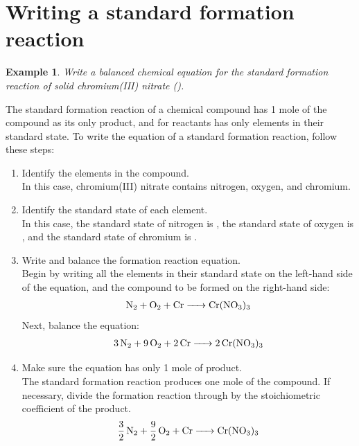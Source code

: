 \documentclass{article}  %
\newtheorem{exmp}{Example}
\begin{document}
\section*{Writing a standard formation reaction}
\begin{exmp}
    Write a balanced chemical equation for the standard formation reaction of solid chromium(III) nitrate (). 
\end{exmp}
The standard formation reaction of a chemical compound has 1 mole of the compound as its only product, and for reactants has only elements in their standard state.
To write the equation of a standard formation reaction, follow these steps:
\begin{enumerate}
    \item Identify the elements in the compound. \\
        In this case, chromium(III) nitrate contains nitrogen, oxygen, and chromium. 
    \item Identify the standard state of each element. \\
        In this case, the standard state of nitrogen is , the standard state of oxygen is , and the standard state of chromium is . 
    \item Write and balance the formation reaction equation.\\
        Begin by writing all the elements in their standard state on the left-hand side of the equation, and the compound to be formed on the right-hand side: 
            \begin{equation*}
                \begin{aligned}
                    \ce{N2 + O2 + Cr -> Cr(NO3)3}
                \end{aligned}
            \end{equation*}
        Next, balance the equation: 
            \begin{equation*}
                \begin{aligned}
                    \ce{3 N2 + 9 O2 + 2 Cr -> 2 Cr(NO3)3}
                \end{aligned}
            \end{equation*}
    \item Make sure the equation has only 1 mole of product.\\
        The standard formation reaction produces one mole of the compound. If necessary, divide the formation reaction through by the stoichiometric coefficient of the product.
            \begin{equation*}
                \begin{aligned}
                    \ce{3/2 N2 + 9/2 O2 + Cr ->  Cr(NO3)3}
                \end{aligned}
            \end{equation*}
\end{enumerate}
\end{document}

